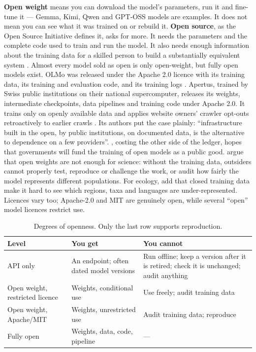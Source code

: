 \textbf{Open weight} means you can download the model's parameters, run it and
fine-tune it --- Gemma, Kimi, Qwen and GPT-OSS models are examples. It does not
mean you can see what it was trained on or rebuild it. \textbf{Open source},
as the Open Source Initiative defines it, asks for more. It needs the
parameters and the complete code used to train and run the model. It also needs
enough information about the training data for a skilled person to build a
substantially equivalent system \parencite{osi2024definition}. Almost every
model sold as open is only open-weight, but fully open models exist. OLMo was
released under the Apache 2.0 licence with its training data, its training and
evaluation code, and its training logs \parencite{groeneveld2024olmo}.
Apertus, trained by Swiss public institutions on their national
supercomputer, releases its weights, intermediate checkpoints, data pipelines
and training code under Apache 2.0. It trains only on openly available data
and applies website owners' crawler opt-outs retroactively to earlier crawls
\parencite{apertus2026report}. Its authors put the case plainly: ``infrastructure
built in the open, by public institutions, on documented data, is the
alternative to dependence on a few providers''.
\textcite{wickham2026tokencost}, costing the other side of the
ledger, hopes that governments will fund the training of open models as a
public good.
\textcite{hai2026openweight} argue that open weights are not enough for science:
without the training data, outsiders cannot properly test, reproduce or
challenge the work, or audit how fairly the model represents different
populations. For
ecology, \textcite{torresani2026opening} add that closed training data make it
hard to see which regions, taxa and languages are under-represented. Licences
vary too; Apache-2.0 and MIT are genuinely open, while several ``open'' model
licences restrict use.

\begin{table}[htbp]
\centering
\caption{Degrees of openness. Only the last row supports reproduction.}
\label{tab:openness}
\small
\begin{tabularx}{\textwidth}{lXX}
\toprule
\textbf{Level} & \textbf{You get} & \textbf{You cannot} \\
\midrule
API only      & An endpoint; often dated model versions & Run offline; keep a version after it is retired; check it is unchanged; audit anything \\
Open weight, restricted licence & Weights, conditional use & Use freely; audit training data \\
Open weight, Apache/MIT & Weights, unrestricted use & Audit training data; reproduce \\
Fully open & Weights, data, code, pipeline & --- \\
\bottomrule
\end{tabularx}
\end{table}

